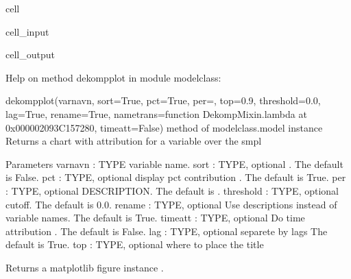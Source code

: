 \documentclass[letterpaper,10pt,english]{jupyterBook}
\begin{document}
\begin{sphinxuseclass}{cell}\begin{sphinxVerbatimInput}

\begin{sphinxuseclass}{cell_input}
\begin{sphinxVerbatim}[commandchars=\\\{\}]
\end{sphinxVerbatim}

\end{sphinxuseclass}\end{sphinxVerbatimInput}
\begin{sphinxVerbatimOutput}

\begin{sphinxuseclass}{cell_output}
\begin{sphinxVerbatim}[commandchars=\\\{\}]
Help on method dekomp\PYGZus{}plot in module modelclass:

dekomp\PYGZus{}plot(varnavn, sort=True, pct=True, per=\PYGZsq{}\PYGZsq{}, top=0.9, threshold=0.0, lag=True, rename=True, nametrans=\PYGZlt{}function Dekomp\PYGZus{}Mixin.\PYGZlt{}lambda\PYGZgt{} at 0x000002093C157280\PYGZgt{}, time\PYGZus{}att=False) method of modelclass.model instance
    Returns  a chart with attribution for a variable over the smpl  
    
    Parameters
    \PYGZhy{}\PYGZhy{}\PYGZhy{}\PYGZhy{}\PYGZhy{}\PYGZhy{}\PYGZhy{}\PYGZhy{}\PYGZhy{}\PYGZhy{}
    varnavn : TYPE
        variable name.
    sort : TYPE, optional
        . The default is False.
    pct : TYPE, optional
        display pct contribution . The default is True.
    per : TYPE, optional
        DESCRIPTION. The default is \PYGZsq{}\PYGZsq{}.
    threshold : TYPE, optional
        cutoff. The default is 0.0.
    rename : TYPE, optional
        Use descriptions instead of variable names. The default is True.
    time\PYGZus{}att : TYPE, optional
        Do time attribution . The default is False.
    lag : TYPE, optional
       separete by lags The default is True.           
    top : TYPE, optional
      where to place the title 
       
    
    Returns
    \PYGZhy{}\PYGZhy{}\PYGZhy{}\PYGZhy{}\PYGZhy{}\PYGZhy{}\PYGZhy{}
    a matplotlib figure instance .
\end{sphinxVerbatim}

\end{sphinxuseclass}\end{sphinxVerbatimOutput}

\end{sphinxuseclass}
\end{document}
